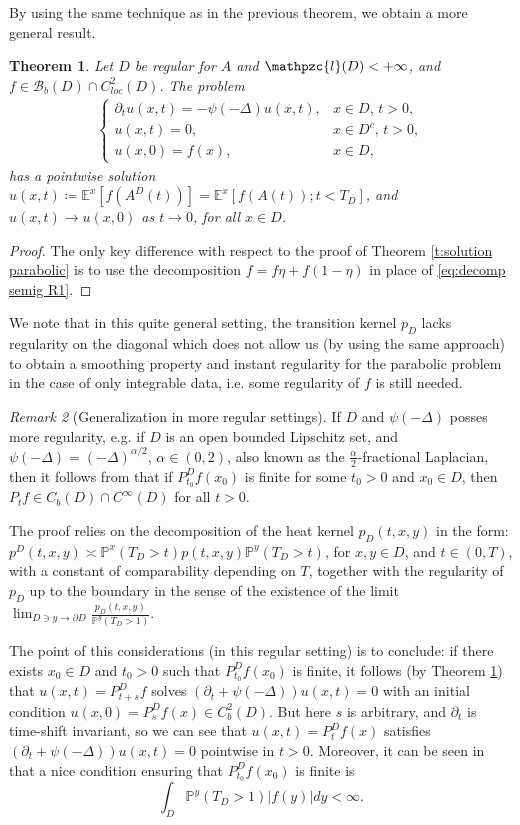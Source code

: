 \documentclass[reqno]{amsart}
\newtheorem{theorem}{Theorem}[section] %
\theoremstyle{remark}
\newtheorem{remark}[theorem]{Remark}
\numberwithin{equation}{section} %
\newcommand{\Lpsi}{\psi(-\Delta)}
\newcommand{\BB}{\mathcal{B}}
\newcommand{\1}{\mathds{1}}
\begin{document}
	By using the same technique as in the previous theorem, we obtain a more general result.
	\begin{theorem}\label{t:solution parabolic-f}
		Let $D$ be regular for $A$ and $\mathpzc{l}(D)<+\infty$, and $f\in \BB_b(D)\cap C_{loc}^2(D)$. The  problem
		\begin{align}
			\begin{cases}
				\partial_t u(x,t)=-\Lpsi u(x,t), & x\in D,\,t>0,\\
				u(x,t)=0,& x\in D^c,\, t>0,\\
				u(x,0)=f(x),& x\in D,
			\end{cases}\label{eq:parabolic problem f}
		\end{align}
		has a pointwise solution $u(x,t)\coloneqq \mathds{E}^x[f(A^D(t))]=\mathds{E}^x[f(A(t));t<T_D]$, and $u(x,t)\to u(x,0)$ as $t\to 0$, for all $x\in D$.
	\end{theorem}
	\begin{proof}
		The only key difference with respect to the proof of Theorem \ref{t:solution parabolic} is to use the decomposition $f=f\eta + f(1-\eta)$ in place of \eqref{eq:decomp semig R1}.
	\end{proof}
	
	We note that in this quite general setting, the transition kernel $p_D$ lacks regularity on the diagonal which does not allow us (by using the same approach) to obtain a smoothing property and instant regularity for the parabolic problem in the case of only integrable data, i.e. some regularity of $f$ is still needed.
	
	\begin{remark}[Generalization in more regular settings]
		If $D$ and $\Lpsi$ posses more regularity, e.g. if $D$ is an open bounded Lipschitz set, and $\Lpsi=(-\Delta)^{\alpha/2}$, $\alpha\in (0,2)$, also known as the $\frac\alpha2$-fractional Laplacian, then it follows from  \cite[Lemma 2.4]{Rut24} that if $ P^D_{t_0}f(x_0)$ is finite for some $t_0>0$ and $x_0\in D$, then $P_tf\in C_b(D)\cap C^\infty(D)$ for all $t>0$.
		
		The proof relies on the decomposition of the heat kernel $p_D(t,x,y)$ in the form: $p^D(t,x,y)\asymp \mathds{P}^x(T_D>t)p(t,x,y)\mathds{P}^y(T_D>t)$, for $x,y\in D$, and $t\in(0,T)$, with a constant of comparability depending on $T$, together with the regularity of $p_D$ up to the boundary in the sense of the existence of the limit $\lim_{D\ni y\to \partial D}\frac{p_D(t,x,y)}{\mathds{P}^y(T_D>1)}$.
		
		The point of this considerations (in this regular setting) is to conclude: if there exists $x_0\in D$ and $t_0>0$ such that $ P^D_{t_0}f(x_0)$ is finite, it follows (by Theorem \ref{t:solution parabolic-f}) that $u(x,t)= P^D_{t+s}f$ solves $(\partial_t+\Lpsi)u(x,t)=0$ with an initial condition $u(x,0)= P^D_sf(x)\in C_b^2(D)$. But here $s$ is arbitrary, and $\partial_t$ is time-shift invariant, so we can see that $u(x,t)= P^D_tf(x)$ satisfies $(\partial_t+\Lpsi)u(x,t)=0$ pointwise in $t>0$. Moreover, it can be seen in \cite[Lemma 2.4]{Rut24} that a nice condition ensuring that $ P^D_{t_0}f(x_0)$ is finite is $$\int_D \mathds{P}^y(T_D>1)|f(y)|dy<\infty.$$
		
	\end{remark}
	
\end{document}
